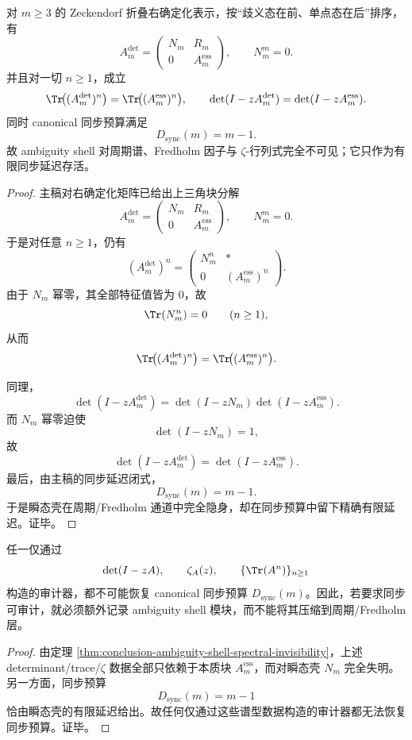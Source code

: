 \begin{theorem}[瞬态壳的谱隐身定理]\label{thm:conclusion-ambiguity-shell-spectral-invisibility}
对 \(m\ge 3\) 的 Zeckendorf 折叠右确定化表示，按“歧义态在前、单点态在后”排序，有
\[
A_m^{\det}=
\begin{pmatrix}
N_m & R_m\\
0 & A_m^{\mathrm{ess}}
\end{pmatrix},
\qquad
N_m^m=0.
\]
并且对一切 \(n\ge 1\)，成立
\[
\Tr\!\bigl((A_m^{\det})^n\bigr)=\Tr\!\bigl((A_m^{\mathrm{ess}})^n\bigr),
\qquad
\det(I-zA_m^{\det})=\det(I-zA_m^{\mathrm{ess}}).
\]
同时 canonical 同步预算满足
\[
D_{\mathrm{sync}}(m)=m-1.
\]
故 ambiguity shell 对周期谱、Fredholm 因子与 \(\zeta\)-行列式完全不可见；它只作为有限同步延迟存活。
\end{theorem}
\begin{proof}
主稿对右确定化矩阵已给出上三角块分解
\[
A_m^{\det}=
\begin{pmatrix}
N_m & R_m\\
0 & A_m^{\mathrm{ess}}
\end{pmatrix},
\qquad
N_m^m=0.
\]
于是对任意 \(n\ge 1\)，仍有
\[
(A_m^{\det})^n=
\begin{pmatrix}
N_m^n & *\\
0 & (A_m^{\mathrm{ess}})^n
\end{pmatrix}.
\]
由于 \(N_m\) 幂零，其全部特征值皆为 \(0\)，故
\[
\Tr(N_m^n)=0
\qquad(n\ge 1),
\]
从而
\[
\Tr\!\bigl((A_m^{\det})^n\bigr)=\Tr\!\bigl((A_m^{\mathrm{ess}})^n\bigr).
\]

同理，
\[
\det(I-zA_m^{\det})
=
\det(I-zN_m)\det(I-zA_m^{\mathrm{ess}}).
\]
而 \(N_m\) 幂零迫使
\[
\det(I-zN_m)=1,
\]
故
\[
\det(I-zA_m^{\det})=\det(I-zA_m^{\mathrm{ess}}).
\]
最后，由主稿的同步延迟闭式，
\[
D_{\mathrm{sync}}(m)=m-1.
\]
于是瞬态壳在周期/Fredholm 通道中完全隐身，却在同步预算中留下精确有限延迟。证毕。
\end{proof}

\begin{corollary}\label{cor:conclusion-zeta-complete-audit-not-sync-complete}
任一仅通过
\[
\det(I-zA),\qquad
\zeta_A(z),\qquad
\{\Tr(A^n)\}_{n\ge 1}
\]
构造的审计器，都不可能恢复 canonical 同步预算 \(D_{\mathrm{sync}}(m)\)。因此，若要求同步可审计，就必须额外记录 ambiguity shell 模块，而不能将其压缩到周期/Fredholm 层。
\end{corollary}
\begin{proof}
由定理 \ref{thm:conclusion-ambiguity-shell-spectral-invisibility}，上述 determinant/trace/\(\zeta\) 数据全部只依赖于本质块 \(A_m^{\mathrm{ess}}\)，而对瞬态壳 \(N_m\) 完全失明。另一方面，同步预算
\[
D_{\mathrm{sync}}(m)=m-1
\]
恰由瞬态壳的有限延迟给出。故任何仅通过这些谱型数据构造的审计器都无法恢复同步预算。证毕。
\end{proof}
